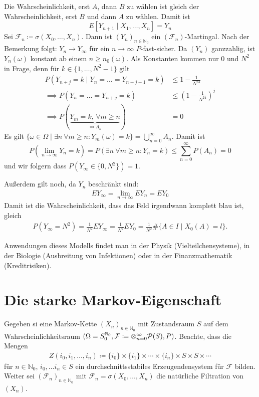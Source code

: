 \documentclass[a4paper,twoside,DIV15,BCOR12mm]{scrbook}
\newcommand{\cF}{\mathcal F}
\begin{document}
\begin{beispiel}
Die Wahrscheinlichkeit, erst $A$, dann $B$ zu wählen ist gleich der Wahrscheinlichkeit, erst $B$ und dann $A$ zu wählen. Damit ist
\[
E[Y_{n+1} \mid X_1,\ldots,X_n] = Y_n
\]
Sei $\cF_n \coloneqq \sigma(X_0,\ldots,X_n)$. Dann ist $(Y_n)_{n\in\mathbb N_0}$ ein $(\cF_n)$-Martingal. Nach der Bemerkung folgt: $Y_n\to Y_\infty$ für ein $n\to\infty$ $P$-fast-sicher. Da $(Y_n)$ ganzzahlig, ist $Y_n(\omega)$ konstant ab einem $n\ge n_0(\omega)$. Als Konstanten kommen nur $0$ und $N^2$ in Frage, denn für $k\in \{1,\ldots,N^2-1\}$ gilt
\begin{align*}
P(Y_{n+j} = k \mid Y_n = \ldots = Y_{n+j-1} = k) &\le 1 - \frac1{N^24} \\
\implies P(Y_n = \ldots = Y_{n+j} = k) &\le (1-\frac1{N^24})^j \\
\implies P(\underbrace{Y_m = k,\, \forall m\ge n}_{\eqqcolon A_n}) &= 0
\end{align*}
Es gilt $\{\omega \in \Omega \mid \exists n\ \forall m\ge n: Y_m(\omega)=k\} = \bigcup_{n=0}^\infty A_n$. Damit ist \[
P(\lim_{n\to\infty} Y_n=k) = P(\exists n\ \forall m\ge n: Y_n=k) \le \sum_{n=0}^\infty P(A_n) =0
\]
und wir folgern dass $P(Y_\infty \in \{0,N^2\}) = 1$.

Außerdem gilt noch, da $Y_n$ beschränkt sind:
\begin{align*}
EY_\infty = \lim_{n\to \infty} EY_n = EY_0
\end{align*}
Damit ist die Wahrscheinlichkeit, dass das Feld irgendwann komplett blau ist, gleich 
\begin{align*}
P(Y_\infty =N^2)=\frac 1{N^2} EY_\infty = \frac 1{N^2}EY_0 = \frac1{N^2}\#\{A\in I\mid X_0(A)=l\}.
\end{align*}

Anwendungen dieses Modells findet man in der Physik (Vielteilchensysteme), in der Biologie (Ausbreitung von Infektionen) oder in der Finanzmathematik (Kreditrisiken).
\end{beispiel}

\section{Die starke Markov-Eigenschaft}

Gegeben si eine Markov-Kette $(X_n)_{n\in\mathbb N_0}$ mit Zustandsraum $S$ auf dem Wahrscheinlichkeitsraum $(\Omega = S_0^{\mathbb N_0}, \cF\da \otimes_{n=0}^\infty \mathcal P(S), P)$. Beachte, dass die Mengen
\begin{align*}
Z(i_0,i_1,\ldots,i_n) \coloneqq \{i_0\} \times \{i_1\} \times \cdots \times \{i_n\} \times S \times S \times \cdots
\end{align*}
für $n\in \mathbb N_0$, $i_0,\ldots i_n\in S$ ein durchschnittsstabiles Erzeugendensystem für $\cF$ bilden. Weiter sei $(\cF_n)_{n\in \mathbb N_0}$ mit $\cF_n=\sigma(X_0,\ldots,X_n)$ die natürliche Filtration von $(X_n)$.
\end{document}

